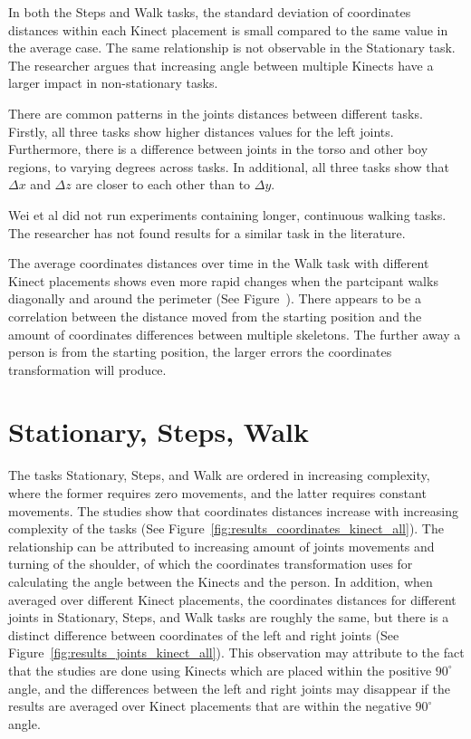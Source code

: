 In both the Steps and Walk tasks, the standard deviation of coordinates distances within each Kinect placement is small compared to the same value in the average case. The same relationship is not observable in the Stationary task. The researcher argues that increasing angle between multiple Kinects have a larger impact in non-stationary tasks.

There are common patterns in the joints distances between different tasks. Firstly, all three tasks show higher distances values for the left joints. Furthermore, there is a difference between joints in the torso and other boy regions, to varying degrees across tasks. In additional, all three tasks show that $\Delta x$ and $\Delta z$ are closer to each other than to $\Delta y$.

Wei et al did not run experiments containing longer, continuous walking tasks. The researcher has not found results for a similar task in the literature.

The average coordinates distances over time in the Walk task with different Kinect placements shows even more rapid changes when the partcipant walks diagonally and around the perimeter (See Figure~). There appears to be a correlation between the distance moved from the starting position and the amount of coordinates differences between multiple skeletons. The further away a person is from the starting position, the larger errors the coordinates transformation will produce.

\section{Stationary, Steps, Walk}
\label{sec:discussion_scenarios}

The tasks Stationary, Steps, and Walk are ordered in increasing complexity, where the former requires zero movements, and the latter requires constant movements. The studies show that coordinates distances increase with increasing complexity of the tasks (See Figure~\ref{fig:results_coordinates_kinect_all}). The relationship can be attributed to increasing amount of joints movements and turning of the shoulder, of which the coordinates transformation uses for calculating the angle between the Kinects and the person. In addition, when averaged over different Kinect placements, the coordinates distances for different joints in Stationary, Steps, and Walk tasks are roughly the same, but there is a distinct difference between coordinates of the left and right joints (See Figure~\ref{fig:results_joints_kinect_all}). This observation may attribute to the fact that the studies are done using Kinects which are placed within the positive $90^{\circ}$ angle, and the differences between the left and right joints may disappear if the results are averaged over Kinect placements that are within the negative $90^{\circ}$ angle.

